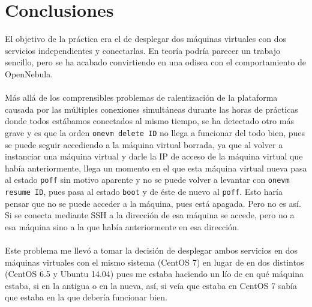 \section{Conclusiones}

El objetivo de la práctica era el de desplegar dos máquinas virtuales con dos servicios independientes y conectarlas. En teoría podría parecer un trabajo sencillo, pero se ha acabado convirtiendo en una odisea con el comportamiento de OpenNebula.
\\ \\
Más allá de los comprensibles problemas de ralentización de la plataforma causada por las múltiples conexiones simultáneas durante las horas de prácticas donde todos estábamos conectados al mismo tiempo, se ha detectado otro más grave y es que la orden \texttt{onevm delete ID} no llega a funcionar del todo bien, pues se puede seguir accediendo a la máquina virtual borrada, ya que al volver a instanciar una máquina virtual y darle la IP de acceso de la máquina virtual que había anteriormente, llega un momento en el que esta máquina virtual nueva pasa al estado \texttt{poff} sin motivo aparente y no se puede volver a levantar con \texttt{onevm resume ID}, pues pasa al estado \texttt{boot} y de éste de nuevo al \texttt{poff}. Esto haría pensar que no se puede acceder a la máquina, pues está apagada. Pero no es así. Si se conecta mediante SSH a la dirección de esa máquina se accede, pero no a esa máquina sino a la que había anteriormente en esa dirección.
\\ \\
Este problema me llevó a tomar la decisión de desplegar ambos servicios en dos máquinas virtuales con el mismo sistema (CentOS 7) en lugar de en dos distintos (CentOS 6.5 y Ubuntu 14.04) pues me estaba haciendo un lío de en qué máquina estaba, si en la antigua o en la nueva, así, si veía que estaba en CentOS 7 sabía que estaba en la que debería funcionar bien.


\newpage


